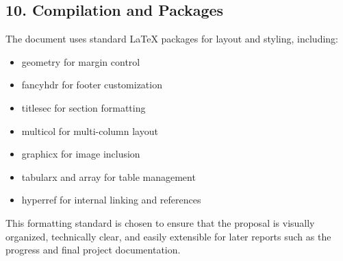 \subsection*{10. Compilation and Packages}
The document uses standard LaTeX packages for layout and styling, including:
\begin{itemize}
    \item
    geometry for margin control
    \item
    fancyhdr for footer customization
    \item
    titlesec for section formatting
    \item
    multicol for multi-column layout
    \item
    graphicx for image inclusion
    \item
    tabularx and array for table management
    \item
    hyperref for internal linking and references
    \end{itemize}

This formatting standard is chosen to ensure that the proposal is visually organized, technically clear, and easily extensible for later reports such as the progress and final project documentation.